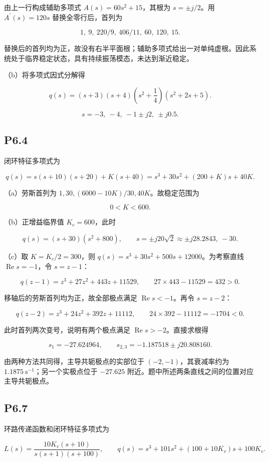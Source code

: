 \documentclass[UTF8,12pt]{ctexart}
\begin{document}
由上一行构成辅助多项式 $A(s)=60s^2+15$，其根为 $s=\pm j/2$。用 $A^{\prime}(s)=120s$ 替换全零行后，首列为

\[
1,\ 9,\ 220/9,\ 406/11,\ 60,\ 120,\ 15.
\]

替换后的首列均为正，故没有右半平面根；辅助多项式给出一对单纯虚根。因此系统处于临界稳定状态，具有持续振荡模态，未达到渐近稳定。

（b）将多项式因式分解得

\[
q(s)=(s+3)(s+4)\left(s^2+\frac14\right)(s^2+2s+5).
\]

\[
s=-3,\ -4,\ -1\pm j2,\ \pm j0.5.
\]


\subsection*{P6.4}
闭环特征多项式为

\[
q(s)=s(s+10)(s+20)+K(s+40)=s^3+30s^2+(200+K)s+40K.
\]

（a）劳斯首列为 $1,30,(6000-10K)/30,40K$。故稳定范围为

\[
0<K<600.
\]

（b）正增益临界值 $K_c=600$，此时

\[
q(s)=(s+30)(s^2+800),\qquad s=\pm j20\sqrt2\approx\pm j28.2843,\ -30.
\]

（c）取 $K=K_c/2=300$，则 $q(s)=s^3+30s^2+500s+12000$。为考察直线 $\operatorname{Re}s=-1$，令 $s=z-1$：

\[
q(z-1)=z^3+27z^2+443z+11529,\qquad 27\times443-11529=432>0.
\]

移轴后的劳斯首列均为正，故全部极点满足 $\operatorname{Re}s<-1$。再令 $s=z-2$：

\[
q(z-2)=z^3+24z^2+392z+11112,\qquad 24\times392-11112=-1704<0.
\]

此时首列两次变号，说明有两个极点满足 $\operatorname{Re}s>-2$。直接求根得

\[
s_1=-27.624964,\qquad s_{2,3}=-1.187518\pm j20.808160.
\]

由两种方法共同得，主导共轭极点的实部位于 $(-2,-1)$，其衰减率约为 $1.1875\ \mathrm{s}^{-1}$；另一个实极点位于 $-27.625$ 附近。题中所述两条直线之间的位置对应主导共轭极点。


\subsection*{P6.7}
环路传递函数和闭环特征多项式为

\[
L(s)=\frac{10K_v(s+10)}{s(s+1)(s+100)},\qquad q(s)=s^3+101s^2+(100+10K_v)s+100K_v.
\]
\end{document}
